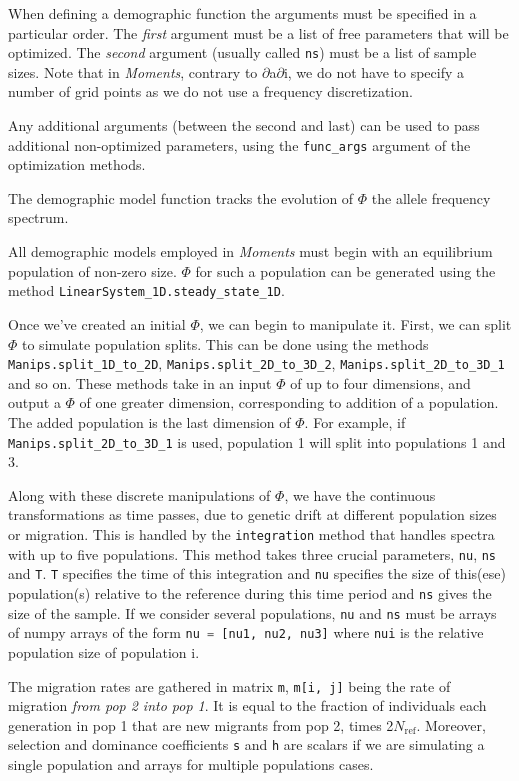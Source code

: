 \documentclass[12pt]{article}
\makeatletter
\newcommand{\dadi}{$\partial$a$\partial$i\xspace}
\newcommand{\Nref}{\ensuremath{N_\text{ref}}\xspace}
\newcommand{\py}[1]{\lstinline[breaklines=true,language=Python, showstringspaces=False]@#1@}
\makeatother
\begin{document}
When defining a demographic function the arguments must be specified in a particular order.
The \emph{first} argument must be a list of free parameters that will be optimized.
The \emph{second} argument (usually called \py{ns}) must be a list of sample sizes.
Note that in \textit{Moments}, contrary to \dadi, we do not have to specify a number of grid points as we do not use a frequency discretization. 

Any additional arguments (between the second and last) can be used to pass additional non-optimized parameters, using the \py{func_args} argument of the optimization methods.

The demographic model function tracks the evolution of $\Phi$ the allele frequency spectrum.

All demographic models employed in \textit{Moments} must begin with an equilibrium population of non-zero size.
$\Phi$ for such a population can be generated using the method \py{LinearSystem_1D.steady_state_1D}.

Once we've created an initial $\Phi$, we can begin to manipulate it.
First, we can split $\Phi$ to simulate population splits.
This can be done using the methods \py{Manips.split_1D_to_2D}, \py{Manips.split_2D_to_3D_2}, \py{Manips.split_2D_to_3D_1} and so on.
These methods take in an input $\Phi$ of up to four dimensions, and output a $\Phi$ of one greater dimension, corresponding to addition of a population.
The added population is the last dimension of $\Phi$.
For example, if \py{Manips.split_2D_to_3D_1} is used, population 1 will split into populations 1 and 3.

Along with these discrete manipulations of $\Phi$, we have the continuous transformations as time passes, due to genetic drift at different population sizes or migration.
This is handled by the \py{integration} method that handles spectra with up to five populations.
This method takes three crucial parameters, \py{nu}, \py{ns} and \py{T}.
\py{T} specifies the time of this integration and \py{nu} specifies the size of this(ese) population(s) relative to the reference during this time period and \py{ns} gives the size of the sample. If we consider several populations, \py{nu} and \py{ns} must be arrays of numpy arrays of the form \py{nu = [nu1, nu2, nu3]} where \py{nui} is the relative population size of population i.

The migration rates are gathered in matrix \py{m}, \py{m[i, j]} being the rate of migration \emph{from pop 2 into pop 1}. 
It is equal to the fraction of individuals each generation in pop 1 that are new migrants from pop 2, times 2\Nref. Moreover, selection and dominance coefficients \py{s} and \py{h} are scalars if we are simulating a single population and arrays for multiple populations cases. 
\end{document}
